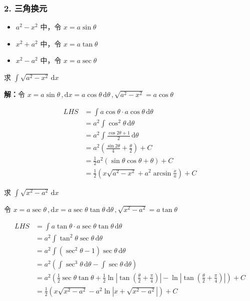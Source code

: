 \subsubsection{2. 三角换元}
\begin{itemize}
\item $a^2-x^2$ 中，令 $x=a\sin\theta$ 
\end{itemize}
\begin{itemize}
\item $x^2+a^2$ 中，令 $x=a\tan \theta$ 
\end{itemize}
\begin{itemize}
\item $x^2-a^2$ 中，令 $x=a\sec\theta$ 
\end{itemize}

\begin{example}{}
求 $\displaystyle{\int \sqrt{a^2-x^2}\,\mathrm{d}x}$ 

\textbf{解：}令 $\displaystyle{x=a\sin\theta\,,\mathrm{d}x=a\cos\theta\,\mathrm{d}\theta\,,\sqrt{a^2-x^2}=a\cos\theta}$

\begin{equation}
\begin{aligned}
LHS&=\int a\cos\theta\cdot a\cos\theta\,\mathrm{d}\theta\\ &=a^2\int\cos^2\theta\,\mathrm{d}\theta\\ &=a^2\int\frac{\cos2\theta+1}{2}\,\mathrm{d}\theta\\ &=a^2\left(\frac{\sin2\theta}{4}+\frac{\theta}{2}\right)+C\\ &=\frac{1}{2}a^2\left(\sin\theta\cos\theta+\theta\right)+C\\ &=\frac{1}{2}\left(x\sqrt{a^2-x^2}+a^2\arcsin\frac{x}{a}\right)+C
\end{aligned}
\end{equation}
\end{example}
\begin{example}{}
求 $\displaystyle{\int \sqrt{x^2-a^2}\,\mathrm{d}x}$

令 $\displaystyle{x=a\sec\theta\,,\mathrm{d}x=a\sec\theta\tan\theta\,\mathrm{d}\theta\,,\sqrt{x^2-a^2}=a\tan\theta}$ 

\begin{equation}
\begin{aligned}
LHS&=\int a\tan\theta\cdot a\sec\theta\tan\theta\,\mathrm{d}\theta\\ &=a^2\int \tan^2\theta \sec\theta\,\mathrm{d}\theta\\ &=a^2\int (\sec^2\theta-1)\sec\theta\,\mathrm{d}\theta\\ &=a^2\left(\int\sec^3\theta\,\mathrm{d}\theta-\int\sec\theta\,\mathrm{d}\theta\right)\\ &=a^2\left(\frac{1}{2}\sec\theta\tan\theta+\frac{1}2\ln\left|\tan\left(\frac{\theta}{2}+\frac{\pi}{4}\right)\right|-\ln\left|\tan\left(\frac{\theta}{2}+\frac{\pi}{4}\right)\right|\right)+C\\ &=\frac{1}{2}\left(x\sqrt{x^2-a^2}-a^2\ln|x+\sqrt{x^2-a^2}|\right)+C
\end{aligned}
\end{equation}

\end{example}
